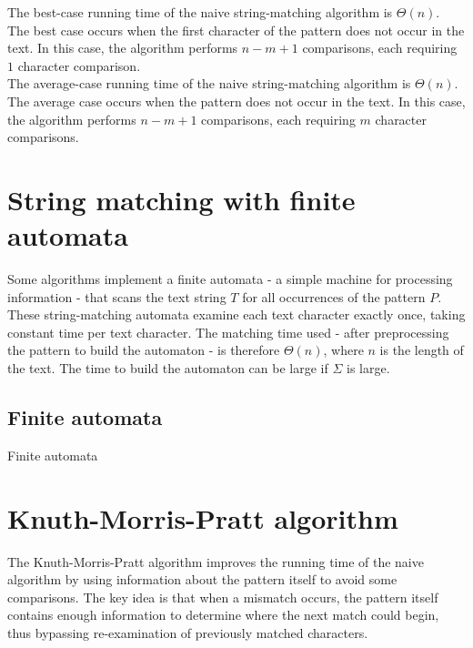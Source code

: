 \documentclass[11pt]{article}
\begin{document}
            The best-case running time of the naive string-matching algorithm is $\Theta(n)$.
            The best case occurs when the first character of the pattern does not occur in the text.
            In this case, the algorithm performs $n - m + 1$ comparisons, each requiring $1$ character comparison. \\

            The average-case running time of the naive string-matching algorithm is $\Theta(n)$.
            The average case occurs when the pattern does not occur in the text.
            In this case, the algorithm performs $n - m + 1$ comparisons, each requiring $m$ character comparisons.

    \section{String matching with finite automata} \label{sec:string_matching_with_finite_automata}

        Some algorithms implement a finite automata - a simple machine for processing information - that scans the text string $T$ for all occurrences of the pattern $P$.
        These string-matching automata examine each text character exactly once, taking constant time per text character.
        The matching time used - after preprocessing the pattern to build the automaton - is therefore $\Theta(n)$, where $n$ is the length of the text.
        The time to build the automaton can be large if $\Sigma$ is large.

        \subsection{Finite automata}\label{subsec:finite_automata}

            Finite automata

    \section{Knuth-Morris-Pratt algorithm} \label{sec:knuth_morris_pratt_algorithm}

        The Knuth-Morris-Pratt algorithm improves the running time of the naive algorithm by using information about the pattern itself to avoid some comparisons.
        The key idea is that when a mismatch occurs, the pattern itself contains enough information to determine where the next match could begin, thus bypassing re-examination of previously matched characters.
\end{document}
